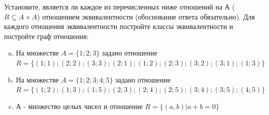 \question
Установите, является ли каждое из перечисленных ниже отношений на А ($R \subseteq A \times A$) отношением эквивалентности (обоснование ответа обязательно). Для каждого отношения эквивалентности постройте классы 
эквивалентности и постройте граф отношения:
\begin{enumerate} [a)]\setcounter{enumi}{0}
\item На множестве $A = \{1; 2; 3\}$ задано отношение $R = \{(1; 1); (2; 2); (3; 3); (2; 1); (1; 2); (2; 3); (3; 2); (3; 1); (1; 3)\}$
\item На множестве $A = \{1; 2; 3; 4; 5\}$ задано отношение $R = \{(1; 2); (1; 3); (1; 5); (2; 3); (2; 4); (2; 5); (3; 4); (3; 5); (4; 5)\}$
\item А - множество целых чисел и отношение $R = \{(a,b)|a + b = 0\}$
\end{enumerate}